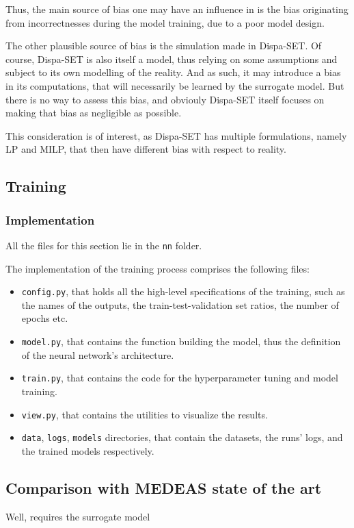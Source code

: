 Thus, the main source of bias one may have an influence in is the bias originating from incorrectnesses during the model training, due to a poor model design.

The other plausible source of bias is the simulation made in Dispa-SET. Of course, Dispa-SET is also itself a model, thus relying on some assumptions and subject to its own modelling of the reality. And as such, it may introduce a bias in its computations, that will necessarily be learned by the surrogate model. But there is no way to assess this bias, and obviouly Dispa-SET itself focuses on making that bias as negligible as possible.

This consideration is of interest, as Dispa-SET has multiple formulations, namely LP and MILP, that then have different bias with respect to reality.

\subsection{Training}

\subsubsection{Implementation}

All the files for this section lie in the \texttt{nn} folder.

The implementation of the training process comprises the following files:
\begin{itemize}
    \item \texttt{config.py}, that holds all the high-level specifications of the training, such as the names of the outputs, the train-test-validation set ratios, the number of epochs etc.
    \item \texttt{model.py}, that contains the function building the model, thus the definition of the neural network's architecture.
    \item \texttt{train.py}, that contains the code for the hyperparameter tuning and model training.
    \item \texttt{view.py}, that contains the utilities to visualize the results.
    \item \texttt{data}, \texttt{logs}, \texttt{models} directories, that contain the datasets, the runs' logs, and the trained models respectively.
\end{itemize}

\subsection{Comparison with MEDEAS state of the art}

Well, requires the surrogate model


